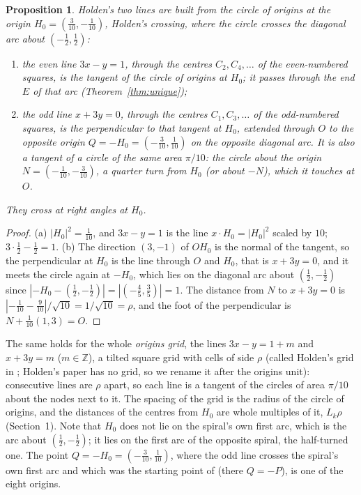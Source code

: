 \documentclass[11pt,a4paper]{article}
\theoremstyle{plain}
\newtheorem{proposition}[theorem]{Proposition}
\theoremstyle{definition}
\theoremstyle{remark}
\begin{document}
\begin{proposition}\label{prop:holden}
Holden's two lines are built from the circle of origins at the origin $H_0=(\tfrac3{10},-\tfrac1{10})$, Holden's crossing, where the circle crosses the diagonal arc about $(-\tfrac12,\tfrac12)$:
\begin{enumerate}[label=(\alph*),itemsep=1pt]
\item the \emph{even line} $3x-y=1$, through the centres $C_2,C_4,\dots$ of the even-numbered squares, is the tangent of the circle of origins at $H_0$; it passes through the end $E$ of that arc (Theorem~\ref{thm:unique});
\item the \emph{odd line} $x+3y=0$, through the centres $C_1,C_3,\dots$ of the odd-numbered squares, is the perpendicular to that tangent at $H_0$, extended through $O$ to the opposite origin $Q=-H_0=(-\tfrac3{10},\tfrac1{10})$ on the opposite diagonal arc. It is also a tangent of a circle of the same area $\pi/10$: the circle about the origin $N=(-\tfrac1{10},-\tfrac3{10})$, a quarter turn from $H_0$ (or about $-N$), which it touches at $O$.
\end{enumerate}
They cross at right angles at $H_0$.

\end{proposition}

\begin{proof}
(a) $|H_0|^2=\tfrac1{10}$, and $3x-y=1$ is the line $x\cdot H_0=|H_0|^2$ scaled by $10$; $3\cdot\tfrac12-\tfrac12=1$. (b) The direction $(3,-1)$ of $O H_0$ is the normal of the tangent, so the perpendicular at $H_0$ is the line through $O$ and $H_0$, that is $x+3y=0$, and it meets the circle again at $-H_0$, which lies on the diagonal arc about $(\tfrac12,-\tfrac12)$ since $|-H_0-(\tfrac12,-\tfrac12)|=|(-\tfrac45,\tfrac35)|=1$. The distance from $N$ to $x+3y=0$ is $|{-\tfrac1{10}}-\tfrac9{10}|/\sqrt{10}=1/\sqrt{10}=\rho$, and the foot of the perpendicular is $N+\tfrac1{10}(1,3)=O$.
\end{proof}

The same holds for the whole \emph{origins grid}, the lines $3x-y=1+m$ and $x+3y=m$ ($m\in\mathbb Z$), a tilted square grid with cells of side $\rho$ (called Holden's grid in \cite{rhombus}; Holden's paper has no grid, so we rename it after the origins unit): consecutive lines are $\rho$ apart, so each line is a tangent of the circles of area $\pi/10$ about the nodes next to it. The spacing of the grid is the radius of the circle of origins, and the distances of the centres from $H_0$ are whole multiples of it, $L_k\rho$ (Section~1). Note that $H_0$ does not lie on the spiral's own first arc, which is the arc about $(\tfrac12,-\tfrac12)$; it lies on the first arc of the opposite spiral, the half-turned one. The point $Q=-H_0=(-\tfrac3{10},\tfrac1{10})$, where the odd line crosses the spiral's own first arc and which was the starting point of \cite{rhombus} (there $Q=-P$), is one of the eight origins.
\end{document}
